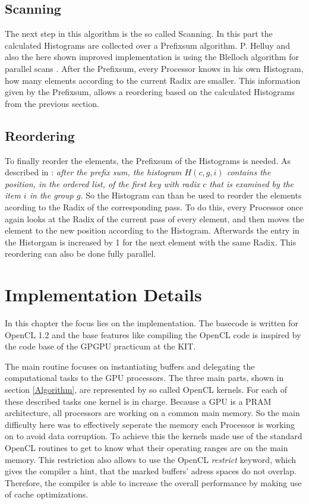 \documentclass{llncs}
\begin{document}
\subsection{Scanning}
The next step in this algorithm is the so called Scanning. In this part the calculated Histograms are collected over a Prefixsum algorithm. P. Helluy \cite{ocl-radix-helluy} and also the here shown improved implementation is using the Blelloch algorithm for parallel scans \cite{blelloch1989scans}. After the Prefixsum, every Processor knows in his own Histogram, how many elements according to the current Radix are smaller. This information given by the Prefixsum, allows a reordering based on the calculated Histograms from the previous section.

\subsection{Reordering}
To finally reorder the elements, the Prefixsum of the Histograms is needed. As described in \cite{ocl-radix-helluy}: \textit{after the prefix sum, the histogram $H(c, g, i)$ contains the position, in the ordered list, of the first key with radix $c$ that is examined by the item $i$ in the group $g$.} So the Histogram can than be used to reorder the elements acording to the Radix of the corresponding pass. To do this, every Processor once again looks at the Radix of the current pass of every element, and then moves the element to the new position according to the Histogram. Afterwards the entry in the Historgam is increased by 1 for the next element with the same Radix. This reordering can also be done fully parallel.

\newpage
\section{Implementation Details}
In this chapter the focus lies on the implementation. The basecode is written for OpenCL 1.2 and the base features like compiling the OpenCL code is inspired by the code base of the GPGPU practicum at the KIT.

The main routine focuses on instantiating buffers and delegating the computational tasks to the GPU processors. The three main parts, shown in section \ref{Algorithm}, are represented by so called OpenCL kernels. For each of these described tasks one kernel is in charge. Because a GPU is a PRAM architecture, all processors are working on a common main memory. So the main difficulty here was to effectively seperate the memory each Processor is working on to avoid data corruption. To achieve this the kernels made use of the standard OpenCL routines to get to know what their operating ranges are on the main memory. This restriction also allows to use the OpenCL \textit{restrict} keyword, which gives the compiler a hint, that the marked buffers' adress spaces do not overlap. Therefore, the compiler is able to increase the overall performance by making use of cache optimizations.
\end{document}
